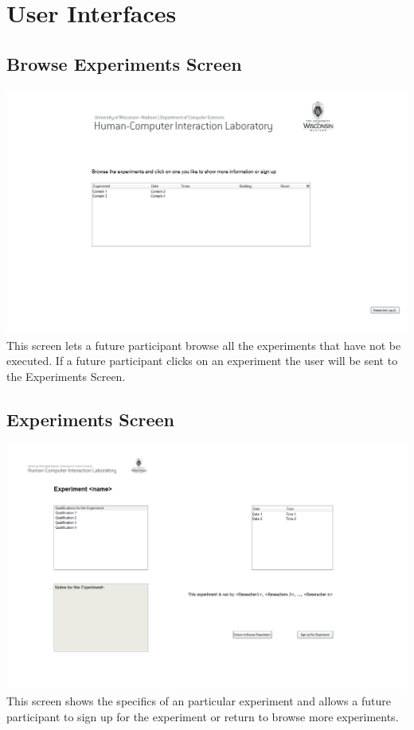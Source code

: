 \section{User Interfaces}
\subsection{Browse Experiments Screen}
\includegraphics[width=6in]{../other/User_Interface/Milestone_3/start_screen.png}\\
This screen lets a future participant browse all the experiments that have not be executed.  If a future participant clicks on an experiment the user will be sent to the Experiments Screen.

\subsection{Experiments Screen}
\includegraphics[width=6in]{../other/User_Interface/Milestone_3/experiment_screen.png}\\
This screen shows the specifics of an particular experiment and allows a future participant to sign up for the experiment or return to browse more experiments.

